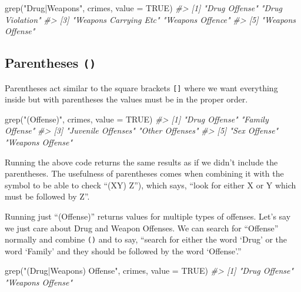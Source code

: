 \documentclass[
]{krantz}
\makeatletter
\newenvironment{Shaded}{\begin{snugshade}}{\end{snugshade}}
\newcommand{\AttributeTok}[1]{\textcolor[rgb]{0.61,0.61,0.61}{#1}}
\newcommand{\CommentTok}[1]{\textcolor[rgb]{0.37,0.37,0.37}{\textit{#1}}}
\newcommand{\ConstantTok}[1]{\textcolor[rgb]{0,0,0}{#1}}
\newcommand{\FunctionTok}[1]{\textcolor[rgb]{0,0,0}{#1}}
\newcommand{\NormalTok}[1]{#1}
\newcommand{\StringTok}[1]{\textcolor[rgb]{0.5,0.5,0.5}{#1}}
\newenvironment{kframe}{%
\medskip{}
\setlength{\fboxsep}{.8em}
 \def\at@end@of@kframe{}%
 \ifinner\ifhmode%
  \def\at@end@of@kframe{\end{minipage}}%
  \begin{minipage}{\columnwidth}%
 \fi\fi%
 \def\FrameCommand##1{\hskip\@totalleftmargin \hskip-\fboxsep
 \colorbox{shadecolor}{##1}\hskip-\fboxsep
     \hskip-\linewidth \hskip-\@totalleftmargin \hskip\columnwidth}%
 \MakeFramed {\advance\hsize-\width
   \@totalleftmargin\z@ \linewidth\hsize
   \@setminipage}}%
 {\par\unskip\endMakeFramed%
 \at@end@of@kframe}
\renewenvironment{Shaded}{\begin{kframe}}{\end{kframe}}
\makeatother
\begin{document}
\begin{Shaded}
\begin{Highlighting}[]
\FunctionTok{grep}\NormalTok{(}\StringTok{"Drug|Weapons"}\NormalTok{, crimes, }\AttributeTok{value =} \ConstantTok{TRUE}\NormalTok{)}
\CommentTok{\#\textgreater{} [1] "Drug Offense"         "Drug Violation"      }
\CommentTok{\#\textgreater{} [3] "Weapons Carrying Etc" "Weapons Offence"     }
\CommentTok{\#\textgreater{} [5] "Weapons Offense"}
\end{Highlighting}
\end{Shaded}

\hypertarget{parentheses}{%
\subsection{\texorpdfstring{Parentheses
\texttt{()}}{Parentheses ()}}\label{parentheses}}

Parentheses act similar to the square brackets
\texttt{{[}{]}} where we want everything inside but with
parentheses the values must be in the proper order.

\begin{Shaded}
\begin{Highlighting}[]
\FunctionTok{grep}\NormalTok{(}\StringTok{"(Offense)"}\NormalTok{, crimes, }\AttributeTok{value =} \ConstantTok{TRUE}\NormalTok{)}
\CommentTok{\#\textgreater{} [1] "Drug Offense"      "Family Offense"   }
\CommentTok{\#\textgreater{} [3] "Juvenile Offenses" "Other Offenses"   }
\CommentTok{\#\textgreater{} [5] "Sex Offense"       "Weapons Offense"}
\end{Highlighting}
\end{Shaded}

Running the above code returns the same results as if we
didn't include the parentheses. The usefulness of
parentheses comes when combining it with the
\texttt{\textbar{}} symbol to be able to check
``(X\textbar Y) Z''), which says, ``look for either X or Y
which must be followed by Z''.

Running just ``(Offense)'' returns values for multiple types
of offenses. Let's say we just care about Drug and Weapon
Offenses. We can search for ``Offense'' normally and combine
\texttt{()} and \texttt{\textbar{}} to say, ``search for
either the word `Drug' or the word `Family' and they should
be followed by the word `Offense'.''

\begin{Shaded}
\begin{Highlighting}[]
\FunctionTok{grep}\NormalTok{(}\StringTok{"(Drug|Weapons) Offense"}\NormalTok{, crimes, }\AttributeTok{value =} \ConstantTok{TRUE}\NormalTok{)}
\CommentTok{\#\textgreater{} [1] "Drug Offense"    "Weapons Offense"}
\end{Highlighting}
\end{Shaded}
\end{document}
